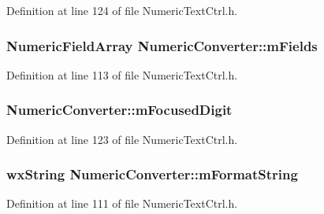 Definition at line 124 of file Numeric\+Text\+Ctrl.\+h.

\subsubsection[{\texorpdfstring{m\+Fields}{mFields}}]{\setlength{\rightskip}{0pt plus 5cm}Numeric\+Field\+Array Numeric\+Converter\+::m\+Fields\hspace{0.3cm}{\ttfamily [protected]}}\hypertarget{class_numeric_converter_a237e724ac437e538aec83825aa35853f}{}\label{class_numeric_converter_a237e724ac437e538aec83825aa35853f}


Definition at line 113 of file Numeric\+Text\+Ctrl.\+h.

\subsubsection[{\texorpdfstring{m\+Focused\+Digit}{mFocusedDigit}}]{ Numeric\+Converter\+::m\+Focused\+Digit\hspace{0.3cm}{\ttfamily [protected]}}\hypertarget{class_numeric_converter_a1780654f7174b869496bbff9c6b310b0}{}\label{class_numeric_converter_a1780654f7174b869496bbff9c6b310b0}


Definition at line 123 of file Numeric\+Text\+Ctrl.\+h.

\subsubsection[{\texorpdfstring{m\+Format\+String}{mFormatString}}]{\setlength{\rightskip}{0pt plus 5cm}wx\+String Numeric\+Converter\+::m\+Format\+String\hspace{0.3cm}{\ttfamily [protected]}}\hypertarget{class_numeric_converter_af5ecbc8fd021996712aabe81c1f27db7}{}\label{class_numeric_converter_af5ecbc8fd021996712aabe81c1f27db7}


Definition at line 111 of file Numeric\+Text\+Ctrl.\+h.

